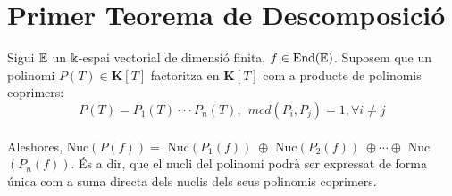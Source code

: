 \section{Primer Teorema de Descomposició}

Sigui $\mathbb{E}$ un $\Bbbk$-espai vectorial de dimensió finita, $f \in \text{End}(\mathbb{E})$. Suposem que un polinomi $P(T) \in \mathbf{K}[T]$ factoritza en $\mathbf{K}[T]$ com a producte de polinomis coprimers:
$$P(T) = P_1(T) \cdot\cdot\cdot P_n(T), \:\: mcd(P_i, P_j) = 1, \forall i \neq j$$\\
Aleshores, Nuc$(P(f)) =$ Nuc$(P_1(f))\; \oplus$ Nuc$(P_2(f))\; \oplus \cdots \oplus$ Nuc$(P_n(f))$. És a dir, que el nucli del polinomi podrà ser expressat de forma única com a suma directa dels nuclis dels seus polinomis coprimers.
\\

